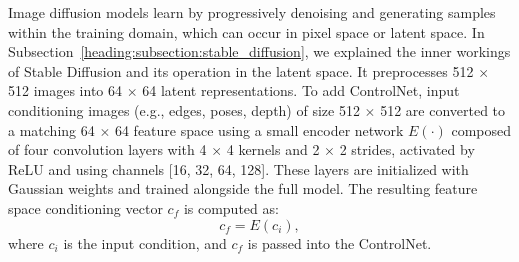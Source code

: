 Image diffusion models learn by progressively denoising and generating samples within the training domain, which can occur in pixel space or latent space. In Subsection~\ref{heading:subsection:stable_diffusion}, we explained the inner workings of Stable Diffusion and its operation in the latent space. It preprocesses 512 $\times$ 512 images into 64 $\times$ 64 latent representations. To add ControlNet, input conditioning images (e.g., edges, poses, depth) of size 512 $\times$ 512 are converted to a matching 64 $\times$ 64 feature space using a small encoder network $E(\cdot)$ composed of four convolution layers with 4 $\times$ 4 kernels and 2 $\times$ 2 strides, activated by ReLU and using channels [16, 32, 64, 128]. These layers are initialized with Gaussian weights and trained alongside the full model. The resulting feature space conditioning vector $c_f$ is computed as:
\[
c_f = E(c_i),
\]
where $c_i$ is the input condition, and $c_f$ is passed into the ControlNet.

